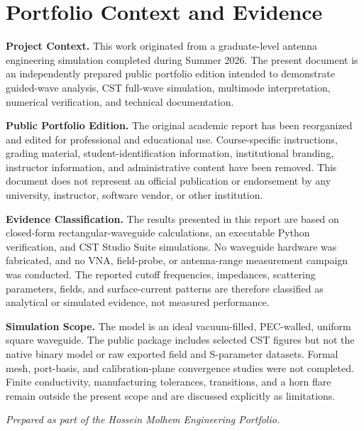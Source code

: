 
\chapter*{Portfolio Context and Evidence}
\thispagestyle{fancy}

\noindent
\textbf{Project Context.}
This work originated from a graduate-level antenna engineering simulation
completed during Summer 2026. The present document is an independently
prepared public portfolio edition intended to demonstrate guided-wave
analysis, CST full-wave simulation, multimode interpretation, numerical
verification, and technical documentation.

\vspace{0.5em}

\noindent
\textbf{Public Portfolio Edition.}
The original academic report has been reorganized and edited for
professional and educational use. Course-specific instructions, grading
material, student-identification information, institutional branding,
instructor information, and administrative content have been removed.
This document does not represent an official publication or endorsement
by any university, instructor, software vendor, or other institution.

\vspace{0.5em}

\noindent
\textbf{Evidence Classification.}
The results presented in this report are based on closed-form
rectangular-waveguide calculations, an executable Python verification,
and CST Studio Suite simulations. No waveguide hardware was fabricated,
and no VNA, field-probe, or antenna-range measurement campaign was
conducted. The reported cutoff frequencies, impedances, scattering
parameters, fields, and surface-current patterns are therefore classified
as analytical or simulated evidence, not measured performance.

\vspace{0.5em}

\noindent
\textbf{Simulation Scope.}
The model is an ideal vacuum-filled, PEC-walled, uniform square waveguide.
The public package includes selected CST figures but not the native binary
model or raw exported field and S-parameter datasets. Formal mesh,
port-basis, and calibration-plane convergence studies were not completed.
Finite conductivity, manufacturing tolerances, transitions, and a horn
flare remain outside the present scope and are discussed explicitly as
limitations.

\vfill

\begin{center}
    \textit{Prepared as part of the Hossein Molhem Engineering Portfolio.}
\end{center}
